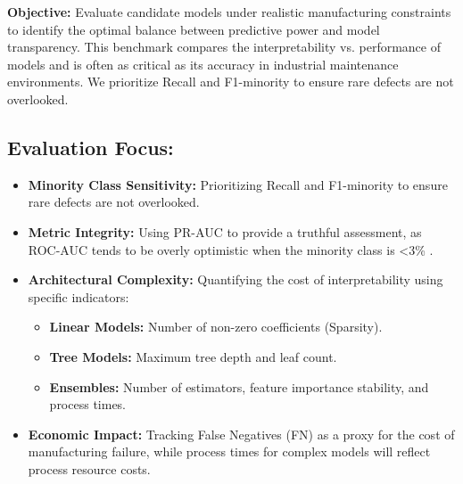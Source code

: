 \documentclass{article}
\begin{document}
\textbf{Objective:} Evaluate candidate models under realistic manufacturing constraints to identify the optimal balance between predictive power and model transparency. This benchmark compares the interpretability vs. performance of models and is often as critical as its accuracy in industrial maintenance environments.
We prioritize Recall and F1-minority to ensure rare defects are not overlooked.
 
\subsection*{Evaluation Focus:}
 
\begin{itemize}
    \item \textbf{Minority Class Sensitivity:} Prioritizing Recall and F1-minority to ensure rare defects are not overlooked.
   
    \item \textbf{Metric Integrity:} Using PR-AUC to provide a truthful assessment, as ROC-AUC tends to be overly optimistic when the minority class is <3\% \cite{imani2026roc}.
   
    \item \textbf{Architectural Complexity:} Quantifying the cost of interpretability using specific indicators:
    \begin{itemize}
        \item \textbf{Linear Models:} Number of non-zero coefficients (Sparsity).
        \item \textbf{Tree Models:} Maximum tree depth and leaf count.
        \item \textbf{Ensembles:} Number of estimators, feature importance stability, and process times.
    \end{itemize}
   
    \item \textbf{Economic Impact:} Tracking False Negatives (FN) as a  proxy for the cost of manufacturing failure, while process times for complex models will reflect process resource costs.
\end{itemize}
 
\begin{table}[h]
\centering
{}
\caption{Benchmark Results Placeholder}
\end{table}
 
\end{document}
